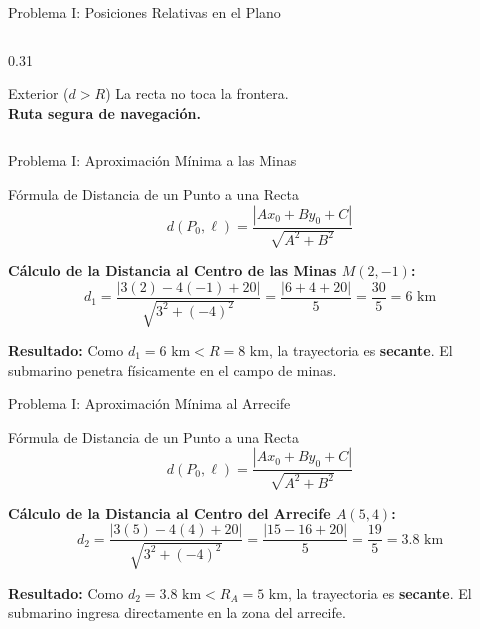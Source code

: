 \documentclass[aspectratio=169]{beamer}
\begin{document}
\begin{frame}{Problema I: Posiciones Relativas en el Plano}
\begin{columns}[T]
    \begin{column}{0.31\textwidth}
      \begin{block}{\centering Exterior ($d > R$)}
        \centering
        \scriptsize
        La recta no toca la frontera.\\
        \textbf{Ruta segura de navegación.}
        \vspace{0.2cm}
        
      \end{block}
    \end{column}
  \end{columns}
\end{frame}


\begin{frame}{Problema I: Aproximación Mínima a las Minas}
  \begin{block}{Fórmula de Distancia de un Punto a una Recta}
    \[d(P_0, \ell) = \frac{|Ax_0 + By_0 + C|}{\sqrt{A^2 + B^2}}\]
  \end{block}
  \vspace{0.3cm}
  \textbf{Cálculo de la Distancia al Centro de las Minas $M(2, -1)$:}
  \[d_1 = \frac{|3(2) - 4(-1) + 20|}{\sqrt{3^2 + (-4)^2}} = \frac{|6 + 4 + 20|}{5} = \frac{30}{5} = 6\text{~km}\]
  \vspace{0.2cm}
  {\centering \textbf{Resultado:} Como $d_1 = 6\text{~km} < R = 8\text{~km}$, la trayectoria es \textbf{secante}. El submarino penetra físicamente en el campo de minas. \par}
\end{frame}


\begin{frame}{Problema I: Aproximación Mínima al Arrecife}
  \begin{block}{Fórmula de Distancia de un Punto a una Recta}
    \[d(P_0, \ell) = \frac{|Ax_0 + By_0 + C|}{\sqrt{A^2 + B^2}}\]
  \end{block}
  \vspace{0.3cm}
  \textbf{Cálculo de la Distancia al Centro del Arrecife $A(5, 4)$:}
  \[d_2 = \frac{|3(5) - 4(4) + 20|}{\sqrt{3^2 + (-4)^2}} = \frac{|15 - 16 + 20|}{5} = \frac{19}{5} = 3.8\text{~km}\]
  \vspace{0.2cm}
  {\centering \textbf{Resultado:} Como $d_2 = 3.8\text{~km} < R_A = 5\text{~km}$, la trayectoria es \textbf{secante}. El submarino ingresa directamente en la zona del arrecife. \par}
\end{frame}
\end{document}
